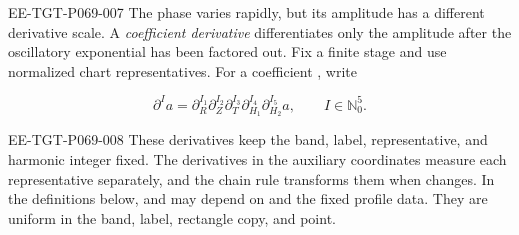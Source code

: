 \begin{EESegment}{EE-TGT-P069-007}
The phase varies rapidly, but its amplitude has a different derivative scale. A \emph{coefficient derivative} differentiates only the amplitude after the oscillatory exponential has been factored out. Fix a finite stage  and use normalized chart representatives. For a coefficient , write
\end{EESegment}
\[
  \partial^Ia
  =\partial_R^{I_1}\partial_Z^{I_2}\partial_T^{I_3}
   \partial_{H_1}^{I_4}\partial_{H_2}^{I_5}a,
  \qquad I\in\mathbb N_0^5.
\]
\begin{EESegment}{EE-TGT-P069-008}
These derivatives keep the band, label, representative, and harmonic integer fixed. The derivatives in the auxiliary coordinates measure each representative separately, and the chain rule transforms them when  changes. In the definitions below,  and  may depend on  and the fixed profile data. They are uniform in the band, label, rectangle copy, and point.
\end{EESegment}

